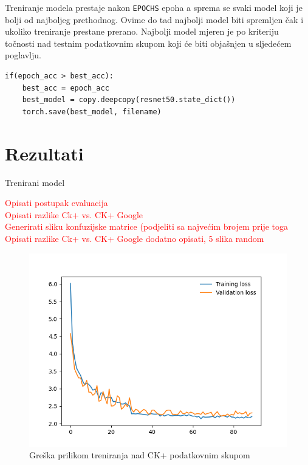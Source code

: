 \documentclass[times, utf8, zavrsni,numeric,pstricks]{fer}
\begin{document}
Treniranje modela prestaje nakon \lstinline"EPOCHS" epoha a sprema se svaki model koji je bolji od najboljeg prethodnog. Ovime do tad najbolji model biti spremljen čak i ukoliko treniranje prestane prerano. Najbolji model mjeren je po kriteriju točnosti nad testnim podatkovnim skupom koji će biti objašnjen u sljedećem poglavlju. 
\begin{Verbatim}[fontsize=\small]
if(epoch_acc > best_acc):
	best_acc = epoch_acc
	best_model = copy.deepcopy(resnet50.state_dict())
	torch.save(best_model, filename)
\end{Verbatim}

\chapter{Rezultati}

Trenirani model 

\textcolor{red}{Opisati postupak evaluacija}\\


\textcolor{red}{Opisati razlike  Ck+ vs. CK+ Google} \\
\textcolor{red}{Generirati sliku konfuzijske matrice (podjeliti sa najvećim brojem prije toga}\\
\textcolor{red}{Opisati razlike  Ck+ vs. CK+ Google} 
\textcolor{red}{dodatno opisati, 5 slika random} 


\begin{figure}[H]
	\centering
	\includegraphics[width=\linewidth, height=0.3\paperheight, keepaspectratio]{val_ck.png}
	\caption{Greška prilikom treniranja nad CK+ podatkovnim skupom}
	\label{loss_ck}
\end{figure}
\end{document}
